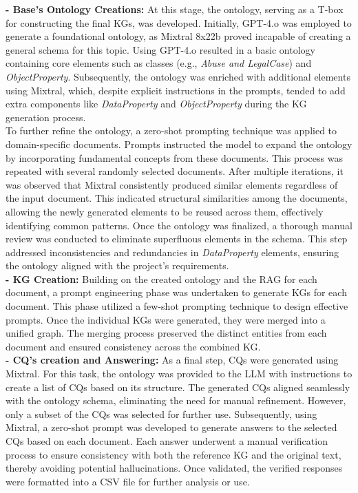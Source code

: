 \documentclass[runningheads]{llncs}
\begin{document}
\begin{enumerate}
\textbf{- Base's Ontology Creations:}
At this stage, the ontology, serving as a T-box for constructing the final KGs, was developed. Initially, GPT-4.o was employed to generate a foundational ontology, as Mixtral 8x22b proved incapable of creating a general schema for this topic. Using GPT-4.o resulted in a basic ontology containing core elements such as classes (e.g.,\textit{ Abuse and LegalCase}) and \textit{ObjectProperty}. Subsequently, the ontology was enriched with additional elements using Mixtral, which, despite explicit instructions in the prompts, tended to add extra components like \textit{DataProperty }and \textit{ObjectProperty} during the KG generation process.\\
To further refine the ontology, a zero-shot prompting technique was applied to domain-specific documents. Prompts instructed the model to expand the ontology by incorporating fundamental concepts from these documents. This process was repeated with several randomly selected documents. After multiple iterations, it was observed that Mixtral consistently produced similar elements regardless of the input document. This indicated structural similarities among the documents, allowing the newly generated elements to be reused across them, effectively identifying common patterns.
Once the ontology was finalized, a thorough manual review was conducted to eliminate superfluous elements in the schema. This step addressed inconsistencies and redundancies in \textit{DataProperty} elements, ensuring the ontology aligned with the project's requirements.\\
\textbf{- KG Creation:} Building on the created ontology and the RAG for each document, a prompt engineering phase was undertaken to generate KGs for each document. This phase utilized a few-shot prompting technique to design effective prompts. Once the individual KGs were generated, they were merged into a unified graph. The merging process preserved the distinct entities from each document and ensured consistency across the combined KG.\\
\textbf{- CQ's creation and Answering:} As a final step, CQs were generated using Mixtral. For this task, the ontology was provided to the LLM with instructions to create a list of CQs based on its structure. The generated CQs aligned seamlessly with the ontology schema, eliminating the need for manual refinement. However, only a subset of the CQs was selected for further use.
Subsequently, using Mixtral, a zero-shot prompt was developed to generate answers to the selected CQs based on each document. Each answer underwent a manual verification process to ensure consistency with both the reference KG and the original text, thereby avoiding potential hallucinations. Once validated, the verified responses were formatted into a CSV file for further analysis or use.


\end{enumerate}
\end{document}
